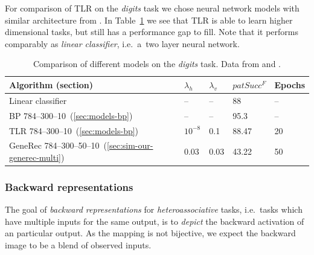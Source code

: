 For comparison of TLR on the \emph{digits} task we chose neural network models with similar architecture from \citet{digits2014mnist}. In Table~\ref{tab:results-cmp-digits} we see that TLR is able to learn higher dimensional tasks, but still has a performance gap to fill. Note that it performs comparably as \emph{linear classifier}, i.e.~a~two layer neural network. 

\begin{table}[H] 
  \centering
    \begin{tabular}{|l|l|l|l|l|}
    \hline
    Algorithm (section)&$\lambda_h$&$\lambda_v$&$patSucc^F$ &Epochs\\ %
    \hline
    Linear classifier & -- & -- & 88 & -- \\ 
    \hline
    BP 784--300--10~(\ref{sec:models-bp})& -- & -- & 95.3 & -- \\ 
    \hline 
    TLR 784--300--10~(\ref{sec:models-bp})& $10^{-8}$ & 0.1 & 88.47 & 20 \\
    \hline 
    GeneRec 784--300--50--10~(\ref{sec:sim-our-generec-multi})& 0.03 & 0.03 & 43.22 & 50 \\
    \hline 
    \end{tabular}
  \caption{Comparison of different models on the \emph{digits} task. Data from \citet{lecun1998gradient} and \citet{digits2014mnist}.} 
  \label{tab:results-cmp-digits}
\end{table}

\subsubsection{Backward representations} 
\label{sec:our-backward-repre}

The goal of \emph{backward representations} for \emph{heteroassociative} tasks, i.e.~tasks which have multiple inputs for the same output, is to \emph{depict} the backward activation of an particular output. As the mapping is not bijective, we expect the backward image to be a blend of observed inputs. %

